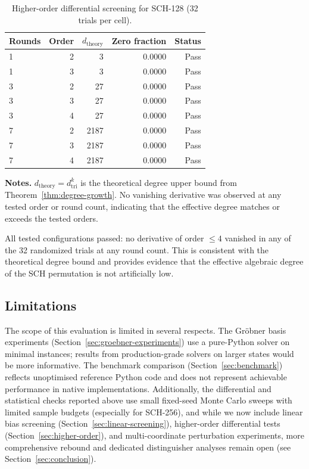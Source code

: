 ﻿\documentclass[english]{aucmcs}
\begin{document}
\begin{table}[H]
\centering
\caption{Higher-order differential screening for SCH-128 (32 trials per cell).}
\label{tab:sch128-higher-order}
\begin{tabular}{@{}lrrrr@{}}
\toprule
Rounds & Order & $d_{\mathrm{theory}}$ & Zero fraction & Status \\
\midrule
1 & 2 & 3    & 0.0000 & Pass \\
1 & 3 & 3    & 0.0000 & Pass \\
3 & 2 & 27   & 0.0000 & Pass \\
3 & 3 & 27   & 0.0000 & Pass \\
3 & 4 & 27   & 0.0000 & Pass \\
7 & 2 & 2187 & 0.0000 & Pass \\
7 & 3 & 2187 & 0.0000 & Pass \\
7 & 4 & 2187 & 0.0000 & Pass \\
\bottomrule
\end{tabular}
\vspace{0.5em}
\begin{minipage}{0.95\linewidth}
\small
\textbf{Notes.} $d_{\mathrm{theory}} = d_{\mathrm{tri}}^k$ is the
theoretical degree upper bound from Theorem~\ref{thm:degree-growth}.
No vanishing derivative was observed at any tested order or round count,
indicating that the effective degree matches or exceeds the tested orders.
\end{minipage}
\end{table}

All tested configurations passed: no derivative of order $\le 4$
vanished in any of the 32 randomized trials at any round count.  This
is consistent with the theoretical degree bound and provides evidence
that the effective algebraic degree of the SCH permutation is not
artificially low.

\subsection{Limitations}

The scope of this evaluation is limited in several respects.  The
Gr\"obner basis experiments (Section~\ref{sec:groebner-experiments})
use a pure-Python solver on minimal instances; results from
production-grade solvers on larger states would be more informative.
The benchmark comparison (Section~\ref{sec:benchmark}) reflects
unoptimised reference Python code and does not represent achievable
performance in native implementations.  Additionally, the differential
and statistical checks reported above use
small fixed-seed Monte Carlo sweeps with limited sample budgets
(especially for SCH-256), and while we now include linear bias screening
(Section~\ref{sec:linear-screening}), higher-order differential tests
(Section~\ref{sec:higher-order}), and multi-coordinate perturbation
experiments, more comprehensive rebound and dedicated distinguisher
analyses remain open (see Section~\ref{sec:conclusion}).
\end{document}
